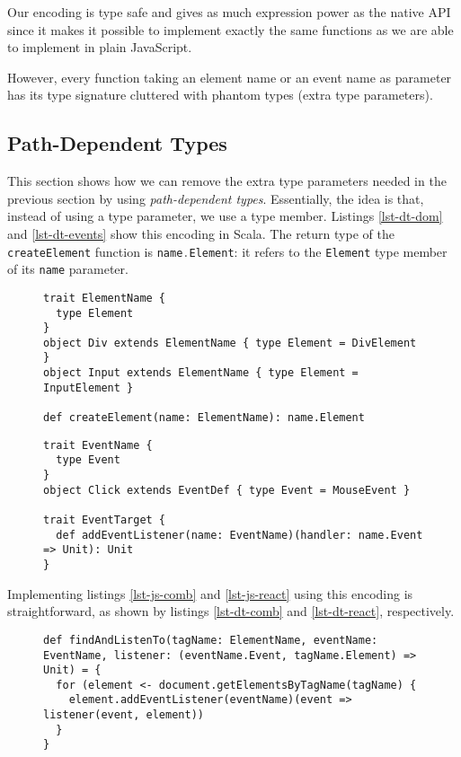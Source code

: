 \documentclass{llncs}
\newcommand{\jscode}[1]{\lstinline[language=JavaScript]|#1|}
\newcommand{\scalacode}[1]{\lstinline[language=Scala]|#1|}
\begin{document}
Our encoding is type safe and gives as much expression power as the native API since it makes it possible to implement exactly the same functions as we are able to implement in plain JavaScript.

However, every function taking an element name or an event name as parameter has its type signature cluttered with phantom types (extra type parameters).

\subsection{Path-Dependent Types}

This section shows how we can remove the extra type parameters needed in the previous section by using \emph{path-dependent types}. Essentially, the idea is that, instead of using a type parameter, we use a type member. Listings \ref{lst-dt-dom} and \ref{lst-dt-events} show this encoding in Scala. The return type of the \scalacode{createElement} function is \scalacode{name.Element}: it refers to the \scalacode{Element} type member of its \scalacode{name} parameter.

\begin{figure}
\begin{lstlisting}[label=lst-dt-dom,caption={Encoding of \jscode{createElement} using path-dependent types}]
trait ElementName {
  type Element
}
object Div extends ElementName { type Element = DivElement }
object Input extends ElementName { type Element = InputElement }

def createElement(name: ElementName): name.Element
\end{lstlisting}
\end{figure}


\begin{figure}
\begin{lstlisting}[label=lst-dt-events,caption={Encoding of \jscode{addEventListener} using path-dependent types}]
trait EventName {
  type Event
}
object Click extends EventDef { type Event = MouseEvent }

trait EventTarget {
  def addEventListener(name: EventName)(handler: name.Event => Unit): Unit
}
\end{lstlisting}
\end{figure}

Implementing listings \ref{lst-js-comb} and \ref{lst-js-react} using this encoding is straightforward, as shown by listings \ref{lst-dt-comb} and \ref{lst-dt-react}, respectively.

\begin{figure}
\begin{lstlisting}[label=lst-dt-comb,caption={Combination of \scalacode{getElementsByTagName} and \scalacode{addEventListener} using path-dependent types}]
def findAndListenTo(tagName: ElementName, eventName: EventName, listener: (eventName.Event, tagName.Element) => Unit) = {
  for (element <- document.getElementsByTagName(tagName) {
    element.addEventListener(eventName)(event => listener(event, element))
  }
}
\end{lstlisting}
\end{figure}
\end{document}
